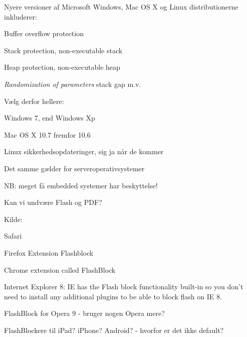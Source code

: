 \documentclass[20pt,landscape,a4paper,footrule]{foils}
\begin{document}

\begin{list1}
\item Nyere versioner af Microsoft Windows, Mac OS X og Linux distributionerne inkluderer:
\begin{list2}
\item Buffer overflow protection
\item Stack protection, non-executable stack
\item Heap protection, non-executable heap
\item \emph{Randomization of parameters} stack gap m.v.
\end{list2}
\item Vælg derfor hellere:
\begin{list2}
\item Windows 7, end Windows Xp
\item Mac OS X 10.7 fremfor 10.6
\item Linux sikkerhedsopdateringer, sig ja når de kommer
\end{list2}
\item Det samme gælder for serveroperativsystemer
\item NB: meget få embedded systemer har beskyttelse!
\end{list1}




\vskip 1cm
\centerline{Kan vi undvære Flash og PDF?}

Kilde: 




\begin{list1}
\item Safari 
\item Firefox Extension Flashblock
\item Chrome extension called FlashBlock
\item Internet Explorer 8: IE has the Flash block functionality built-in so you don't need to install any additional plugins to be able to block flash on IE 8.
\item FlashBlock for Opera 9 - bruger nogen Opera mere?
\item FlashBlockere til iPad? iPhone? Android? - hvorfor er det ikke default?
\end{list1}
\end{document}
